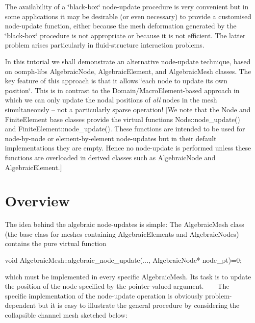 The availability of a \char`\"{}black-\/box\char`\"{} node-\/update procedure is very convenient but in some applications it may be desirable (or even necessary) to provide a customised node-\/update function, either because the mesh deformation generated by the \char`\"{}black-\/box\char`\"{} procedure is not appropriate or because it is not efficient. The latter problem arises particularly in fluid-\/structure interaction problems.

In this tutorial we shall demonstrate an alternative node-\/update technique, based on {\ttfamily oomph-\/lib\textquotesingle{}s} {\ttfamily Algebraic\+Node}, {\ttfamily Algebraic\+Element}, and {\ttfamily Algebraic\+Mesh} classes. The key feature of this approach is that it allows \char`\"{}each node to update its own
position\char`\"{}. This is in contrast to the {\ttfamily Domain/\+Macro\+Element-\/based} approach in which we can only update the nodal positions of {\itshape all} nodes in the mesh simultaneously -- not a particularly sparse operation! \mbox{[}We note that the {\ttfamily Node} and {\ttfamily Finite\+Element} base classes provide the virtual functions {\ttfamily Node\+::node\+\_\+update()} and {\ttfamily Finite\+Element\+::node\+\_\+update()}. These functions are intended to be used for node-\/by-\/node or element-\/by-\/element node-\/updates but in their default implementations they are empty. Hence no node-\/update is performed unless these functions are overloaded in derived classes such as {\ttfamily Algebraic\+Node} and {\ttfamily Algebraic\+Element}.\mbox{]}



 

\hypertarget{index_overview}{}\section{Overview}\label{index_overview}
The idea behind the algebraic node-\/updates is simple\+: The {\ttfamily Algebraic\+Mesh} class (the base class for meshes containing {\ttfamily Algebraic\+Elements} and {\ttfamily Algebraic\+Nodes}) contains the pure virtual function


\begin{DoxyCode}
\textcolor{keywordtype}{void} AlgebraicMesh::algebraic\_node\_update(..., AlgebraicNode* node\_pt)=0;
\end{DoxyCode}


which must be implemented in every specific {\ttfamily Algebraic\+Mesh}. Its task is to update the position of the node specified by the pointer-\/valued argument. ~\newline
~\newline
 The specific implementation of the node-\/update operation is obviously problem-\/dependent but it is easy to illustrate the general procedure by considering the collapsible channel mesh sketched below\+:

